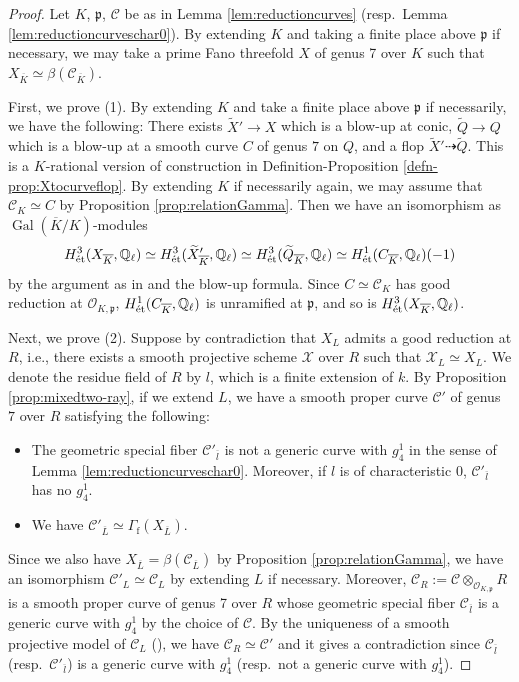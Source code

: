 \documentclass[autodetect-engine, a4paper]{amsart}
\theoremstyle{definition}
\def\p{{\mathfrak p}}
\def\Q{{\mathbb Q}}
\def\cO{\mathcal{O}}
\DeclareMathOperator\Gal{\mathrm{Gal}}
\def\et{\mathop{\text{\rm \'et}}}
\begin{document}
\begin{proof}
Let $K$, $\p$, $\mathcal{C}$ be as in Lemma \ref{lem:reductioncurves} (resp.\ Lemma \ref{lem:reductioncurveschar0}).
By extending $K$ and taking a finite place above $\p$ if necessary, we may take a prime Fano threefold $X$ of genus 7 over $K$ such that $X_{\overline{K}} \simeq \beta (\mathcal{C}_{\overline{K}})$.

First, we prove (1).
By extending $K$ and take a finite place above $\p$ if necessarily, 
we have the following:
There exists $\widetilde{X}' \rightarrow X$ which is a blow-up at conic, $\widetilde{Q} \rightarrow Q$ which is a blow-up at a smooth curve $C$ of genus $7$ on $Q$,
and a flop $\widetilde{X}' \dashrightarrow \widetilde{Q}$.
This is a $K$-rational version of construction in Definition-Proposition \ref{defn-prop:Xtocurveflop}.
By extending $K$ if necessarily again, we may assume that $\mathcal{C}_{K} \simeq C$ by Proposition  \ref{prop:relationGamma}.
Then we have an isomorphism as $\Gal(\overline{K}/K)$-modules
\[
H^3_{\et}(X_{\overline{K}}, \Q_{\ell}) \simeq H^3_{\et} (\widetilde{X}'_{\overline{K}}, \Q_{\ell}) \simeq H^3_{\et} (\widetilde{Q}_{\overline{K}}, \Q_{\ell}) \simeq H^1_{\et}(C_{\overline{K}}, \Q_{\ell})(-1)
\]
by the argument as in \cite[Corolalry 4.12]{Kollarflop} and the blow-up formula.
Since $C \simeq \mathcal{C}_{K}$ has good reduction at $\cO_{K,\p}$, $H^1_{\et} (C_{\overline{K}},\Q_{\ell})$ is unramified at $\p$, and so is $H^3_{\et} (X_{\overline{K}}, \Q_{\ell})$.


Next, we prove (2).
Suppose by contradiction that $X_{L}$ admits a good reduction at $R$, i.e., there exists a smooth projective scheme $\mathcal{X}$ over $R$ such that $\mathcal{X}_{L} \simeq X_{L}$.
We denote the residue field of $R$ by $l$, which is a finite extension of $k$.
By Proposition \ref{prop:mixedtwo-ray},
if we extend $L$, we have a smooth proper curve $\mathcal{C}'$ of genus $7$ over $R$ satisfying the following:
\begin{itemize}
\item 
The geometric special fiber $\mathcal{C}'_{\overline{l}}$ is not a generic curve with $g_4^1$ in the sense of Lemma \ref{lem:reductioncurveschar0}. Moreover, if $l$ is of characteristic $0$, $\mathcal{C}'_{\overline{l}}$ has no $g_4^1$.
\item 
We have
$\mathcal{C}'_{\overline{L}} \simeq \Gamma_{\mathrm{f}}(X_{\overline{L}})$.
\end{itemize}
Since we also have $X_{\overline{L}} = \beta (\mathcal{C}_{\overline{L}})$ by Proposition \ref{prop:relationGamma}, we have an isomorphism $\mathcal{C}'_{L} \simeq \mathcal{C}_{L}$ by extending $L$ if necessary.
Moreover, $\mathcal{C}_{R} := \mathcal{C} \otimes_{\cO_{K,\p}} R$ is a smooth proper curve of genus 7 over $R$ whose geometric special fiber $\mathcal{C}_{\overline{l}}$ is a generic curve with $g_4^1$ by the choice of $\mathcal{C}$.
By the uniqueness of a smooth projective model of $\mathcal{C}_{L}$ (\cite[Lemma 1.12]{Deligne-Mumford}), we have $\mathcal{C}_{R} \simeq \mathcal{C}'$ and it gives a contradiction since $\mathcal{C}_{\overline{l}}$ (resp.\ $\mathcal{C'}_{\overline{l}}$) is a generic curve with $g_4^1$ (resp.\ not a generic curve with $g_4^1$).
\end{proof}
\end{document}
